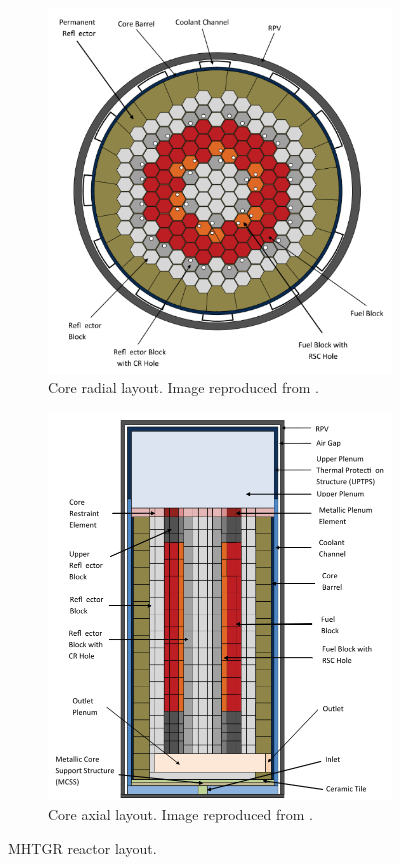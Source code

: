 \documentclass[11pt,letterpaper]{article}
\begin{document}
\begin{figure}[htbp!]
  \centering
  \begin{subfigure}[t]{0.4\textwidth}
    \centering
    \includegraphics[width=0.95\linewidth]{figures/radial-layout.png}
    \caption{Core radial layout. Image reproduced from \cite{oecd_nea_benchmark_2017}.}
  \end{subfigure}
  \begin{subfigure}[t]{0.4\textwidth}
    \centering
    \includegraphics[width=0.95\linewidth]{figures/axial-layout.png}
    \caption{Core axial layout. Image reproduced from \cite{oecd_nea_benchmark_2017}.}
    \label{fig:layoutb}
  \end{subfigure}
  \hfill
  \caption{MHTGR reactor layout.}
  \label{fig:layout}
\end{figure}
\end{document}

